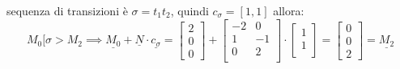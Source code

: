 \begin{esempio}
    sequenza di transizioni è $\sigma = t_1t_2$, quindi $c_\sigma = \left[1,1\right]$
    allora:
    \begin{equation}
        M_0[\sigma>M_2 \implies \underline{M_0}+\underline{N}\cdot \underline{c_\sigma}
        = \left[\begin{array} {c}
                2 \\ 0 \\ 0
            \end{array}\right] + \left[\begin{array} {cc}
                -2 & 0  \\
                1  & -1 \\
                0  & 2  \\
            \end{array}\right] \cdot  \left[\begin{array} {c}
                1 \\
                1 \\
            \end{array}\right] = \left[\begin{array} {c}
                0 \\0\\2
            \end{array}\right] = \underline{M_2}
    \end{equation}
\end{esempio}
